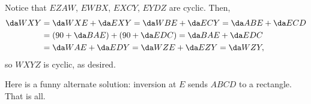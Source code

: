 Notice that $EZAW$, $EWBX$, $EXCY$, $EYDZ$ are cyclic. Then,
\begin{align*}
    \da WXY&=\da WXE+\da EXY=\da WBE+\da ECY=\da ABE+\da ECD\\
    &=(90+\da BAE)+(90+\da EDC)=\da BAE+\da EDC\\
    &=\da WAE+\da EDY=\da WZE+\da EZY=\da WZY,
\end{align*}
so $WXYZ$ is cyclic, as desired.
\begin{remark}
    Here is a funny alternate solution: inversion at $E$ sends $ABCD$ to a rectangle. That is all.
\end{remark}
